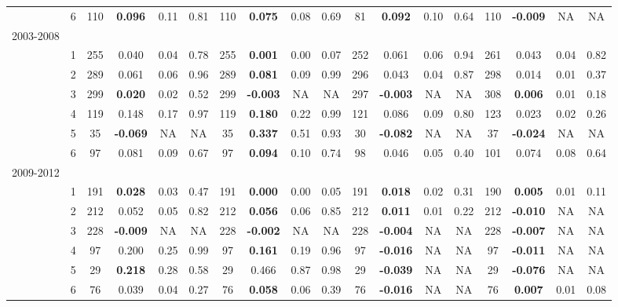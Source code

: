 \begin{sidewaystable}[p]
\begin{tabular}{p{1cm}p{.5cm}cccccccccccccccc}
 & \multicolumn{ 1}{c}{6} & 110 & \textbf{0.096 } & 0.11  & 0.81  & 110 & \textbf{0.075 } & 0.08  & 0.69  & 81 & \textbf{0.092 } & 0.10  & 0.64  & 110 & \textbf{-0.009 } & NA & NA \\ 
2003-2008 \\
& \multicolumn{ 1}{c}{1} & 255 & 0.040  & 0.04  & 0.78  & 255 & \textbf{0.001 } & 0.00  & 0.07  & 252 & 0.061  & 0.06  & 0.94  & 261 & 0.043  & 0.04  & 0.82  \\ 
 & \multicolumn{ 1}{c}{2} & 289 & 0.061  & 0.06  & 0.96  & 289 & \textbf{0.081 } & 0.09  & 0.99  & 296 & 0.043  & 0.04  & 0.87  & 298 & 0.014  & 0.01  & 0.37  \\ 
 & \multicolumn{ 1}{c}{3} & 299 & \textbf{0.020 } & 0.02  & 0.52  & 299 & \textbf{-0.003 } & NA & NA & 297 & \textbf{-0.003 } & NA & NA & 308 & \textbf{0.006 } & 0.01  & 0.18  \\ 
 & \multicolumn{ 1}{c}{4} & 119 & 0.148  & 0.17  & 0.97  & 119 & \textbf{0.180 } & 0.22  & 0.99  & 121 & 0.086  & 0.09  & 0.80  & 123 & 0.023  & 0.02  & 0.26  \\ 
 & \multicolumn{ 1}{c}{5} & 35 & \textbf{-0.069 } & NA & NA & 35 & \textbf{0.337 } & 0.51  & 0.93  & 30 & \textbf{-0.082 } & NA & NA & 37 & \textbf{-0.024 } & NA & NA \\ 
 & \multicolumn{ 1}{c}{6} & 97 & 0.081  & 0.09  & 0.67  & 97 & \textbf{0.094 } & 0.10  & 0.74  & 98 & 0.046  & 0.05  & 0.40  & 101 & 0.074  & 0.08  & 0.64  \\ 
2009-2012\\
 & \multicolumn{ 1}{c}{1} & 191 & \textbf{0.028 } & 0.03  & 0.47  & 191 & \textbf{0.000 } & 0.00  & 0.05  & 191 & \textbf{0.018 } & 0.02  & 0.31  & 190 & \textbf{0.005 } & 0.01  & 0.11  \\ 
\multicolumn{ 1}{c}{} & \multicolumn{ 1}{c}{2} & 212 & 0.052  & 0.05  & 0.82  & 212 & \textbf{0.056 } & 0.06  & 0.85  & 212 & \textbf{0.011 } & 0.01  & 0.22  & 212 & \textbf{-0.010 } & NA & NA \\ 
\multicolumn{ 1}{c}{} & \multicolumn{ 1}{c}{3} & 228 & \textbf{-0.009 } & NA & NA & 228 & \textbf{-0.002 } & NA & NA & 228 & \textbf{-0.004 } & NA & NA & 228 & \textbf{-0.007 } & NA & NA \\ 
\multicolumn{ 1}{c}{} & \multicolumn{ 1}{c}{4} & 97 & 0.200  & 0.25  & 0.99  & 97 & \textbf{0.161 } & 0.19  & 0.96  & 97 & \textbf{-0.016 } & NA & NA & 97 & \textbf{-0.011 } & NA & NA \\ 
\multicolumn{ 1}{c}{} & \multicolumn{ 1}{c}{5} & 29 & \textbf{0.218 } & 0.28  & 0.58  & 29 & 0.466  & 0.87  & 0.98  & 29 & \textbf{-0.039 } & NA & NA & 29 & \textbf{-0.076 } & NA & NA \\ 
\multicolumn{ 1}{c}{} & \multicolumn{ 1}{c}{6} & 76 & 0.039  & 0.04  & 0.27  & 76 & \textbf{0.058 } & 0.06  & 0.39  & 76 & \textbf{-0.016 } & NA & NA & 76 & \textbf{0.007 } & 0.01  & 0.08  \\ 
\end{tabular}
\label{tab:TVposthoc}
\end{sidewaystable}